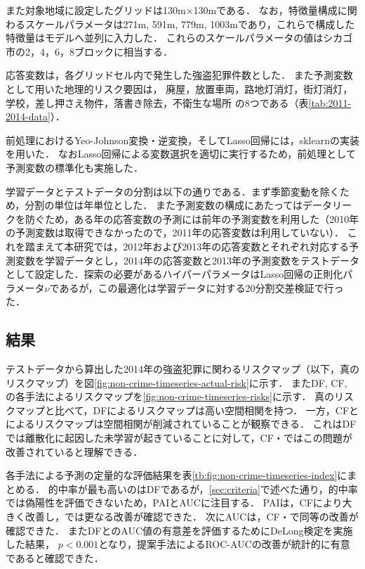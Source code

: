 また対象地域に設定したグリッドは130m$\times$130mである．
なお，特徴量構成に関わるスケールパラメータは271m, 591m, 779m, 1003mであり，これらで構成した特徴量はモデルへ並列に入力した．
これらのスケールパラメータの値はシカゴ市の2，4，6，8ブロックに相当する．

応答変数は，各グリッドセル内で発生した強盗犯罪件数とした．
また予測変数として用いた地理的リスク要因は，
廃屋，放置車両，路地灯消灯，街灯消灯，学校，差し押さえ物件，落書き除去，不衛生な場所
の8つである（表\ref{tab:2011-2014-data}）．

前処理におけるYeo-Johnson変換・逆変換，そしてLasso回帰には，sklearn\cite{scikit-learn}の実装を用いた．
なおLasso回帰による変数選択を適切に実行するため，前処理として予測変数の標準化も実施した．

学習データとテストデータの分割は以下の通りである．まず季節変動を除くため，分割の単位は年単位とした．
また予測変数の構成にあたってはデータリークを防ぐため，ある年の応答変数の予測には前年の予測変数を利用した（2010年の予測変数は取得できなかったので，2011年の応答変数は利用していない）．
これを踏まえて本研究では，2012年および2013年の応答変数とそれぞれ対応する予測変数を学習データとし，2014年の応答変数と2013年の予測変数をテストデータとして設定した．探索の必要があるハイパーパラメータはLasso回帰の正則化パラメータ$\nu$であるが，この最適化は学習データに対する20分割交差検証で行った．

\subsection{結果}
テストデータから算出した2014年の強盗犯罪に関わるリスクマップ（以下，真のリスクマップ）を図\ref{fig:non-crime-timeseries-actual-risk}に示す．
またDF, CF, \cfsq の各手法によるリスクマップを\ref{fig:non-crime-timeseries-risks}に示す．
真のリスクマップと比べて，DFによるリスクマップは高い空間相関を持つ．
一方，CFと\cfsq によるリスクマップは空間相関が削減されていることが観察できる．
これはDFでは離散化に起因した未学習が起きていることに対して，CF・\cfsq ではこの問題が改善されていると理解できる．

各手法による予測の定量的な評価結果を表\ref{tb:fig:non-crime-timeseries-index}にまとめる．
的中率が最も高いのはDFであるが，\cref{sec:criteria}で述べた通り，的中率では偽陽性を評価できないため，PAIとAUCに注目する．
PAIは，CFにより大きく改善し，\cfsq では更なる改善が確認できた．
次にAUCは，CF・\cfsq で同等の改善が確認できた．
またDFと\cfsq のAUC値の有意差を評価するためにDeLong検定\cite{DeLong}を実施した結果，
$p<0.001$となり，提案手法によるROC-AUCの改善が統計的に有意であると確認できた．


